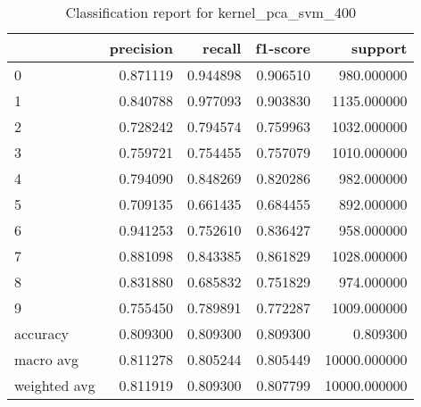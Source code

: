\begin{table}[htb!]
\centering
\caption{Classification report for kernel_pca_svm_400}
\label{tab:classification-report-kernel_pca_svm_400}
\begin{tabular}{lrrrr}
\toprule
 & precision & recall & f1-score & support \\
\midrule
0 & 0.871119 & 0.944898 & 0.906510 & 980.000000 \\
1 & 0.840788 & 0.977093 & 0.903830 & 1135.000000 \\
2 & 0.728242 & 0.794574 & 0.759963 & 1032.000000 \\
3 & 0.759721 & 0.754455 & 0.757079 & 1010.000000 \\
4 & 0.794090 & 0.848269 & 0.820286 & 982.000000 \\
5 & 0.709135 & 0.661435 & 0.684455 & 892.000000 \\
6 & 0.941253 & 0.752610 & 0.836427 & 958.000000 \\
7 & 0.881098 & 0.843385 & 0.861829 & 1028.000000 \\
8 & 0.831880 & 0.685832 & 0.751829 & 974.000000 \\
9 & 0.755450 & 0.789891 & 0.772287 & 1009.000000 \\
accuracy & 0.809300 & 0.809300 & 0.809300 & 0.809300 \\
macro avg & 0.811278 & 0.805244 & 0.805449 & 10000.000000 \\
weighted avg & 0.811919 & 0.809300 & 0.807799 & 10000.000000 \\
\bottomrule
\end{tabular}
\end{table}
